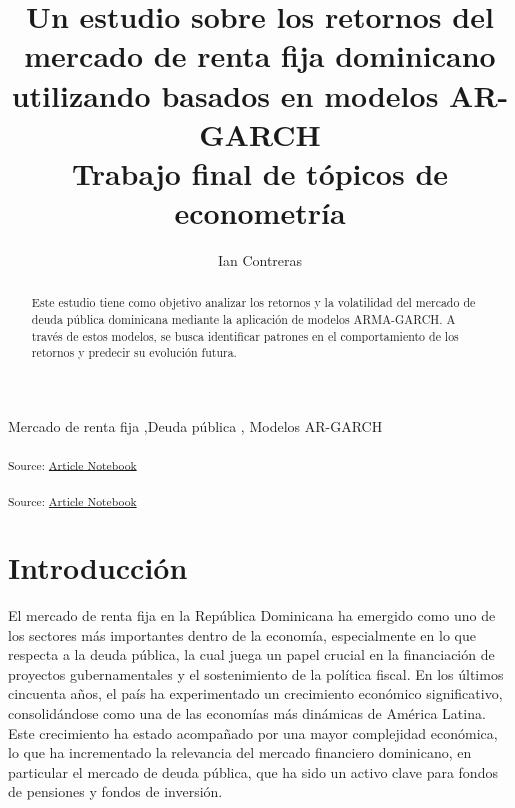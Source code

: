 \documentclass[
  number,
  preprint,
  3p,
  onecolumn]{elsarticle}
\begin{document}
\begin{frontmatter}
\title{Un estudio sobre los retornos del mercado de renta fija
dominicano utilizando basados en modelos AR-GARCH \\\large{Trabajo final
de tópicos de econometría} }
\author[1]{Ian Contreras%
%
}



        
\begin{abstract}
Este estudio tiene como objetivo analizar los retornos y la volatilidad
del mercado de deuda pública dominicana mediante la aplicación de
modelos ARMA-GARCH. A través de estos modelos, se busca identificar
patrones en el comportamiento de los retornos y predecir su evolución
futura.
\end{abstract}





\begin{keyword}
    Mercado de renta fija \sep Deuda pública \sep 
    Modelos AR-GARCH
\end{keyword}
\end{frontmatter}
    

\label{importing-libraries}
\textsubscript{Source:
\href{https://iancont.github.io/fixed_income_garch/index.qmd.html}{Article
Notebook}}

\label{importing-data}
\textsubscript{Source:
\href{https://iancont.github.io/fixed_income_garch/index.qmd.html}{Article
Notebook}}

\section{Introducción}\label{introducciuxf3n}

El mercado de renta fija en la República Dominicana ha emergido como uno
de los sectores más importantes dentro de la economía, especialmente en
lo que respecta a la deuda pública, la cual juega un papel crucial en la
financiación de proyectos gubernamentales y el sostenimiento de la
política fiscal. En los últimos cincuenta años, el país ha experimentado
un crecimiento económico significativo, consolidándose como una de las
economías más dinámicas de América Latina. Este crecimiento ha estado
acompañado por una mayor complejidad económica, lo que ha incrementado
la relevancia del mercado financiero dominicano, en particular el
mercado de deuda pública, que ha sido un activo clave para fondos de
pensiones y fondos de inversión.
\end{document}
